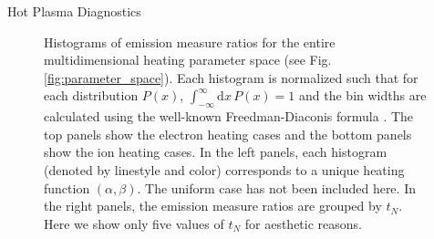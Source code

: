 \documentclass[final]{beamer}
\begin{document}
\begin{frame}
\begin{columns}[t]
\begin{column}{0.49\linewidth}
\begin{block}{Hot Plasma Diagnostics}
\begin{figure}
{        \label{fig:ratio_electron_alpha}}
        \caption{Histograms of emission measure ratios for the entire multidimensional heating parameter space (see Fig. \ref{fig:parameter_space}). Each histogram is normalized such that for each distribution $P(x)$, $\int^{\infty}_{-\infty}\mathrm{d}x\,P(x)=1$ and the bin widths are calculated using the well-known Freedman-Diaconis formula \citep{freedman_histogram_1981}. The top panels show the electron heating cases and the bottom panels show the ion heating cases. In the left panels, each histogram (denoted by linestyle and color) corresponds to a unique heating function $(\alpha,\beta)$. The uniform case has not been included here. In the right panels, the emission measure ratios are grouped by $t_N$. Here we show only five values of $t_N$ for aesthetic reasons.}
      \end{figure}
      \vspace{-2ex}

\end{block}
\end{column}
\end{columns}
\end{frame}
\end{document}
